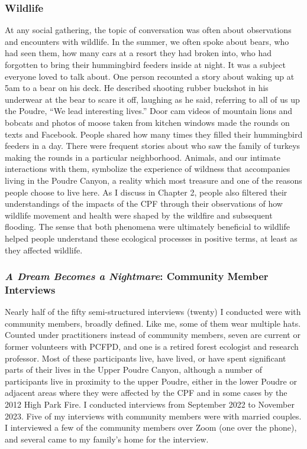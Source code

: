 \documentclass[
]{article}
\begin{document}
\subsubsection{Wildlife}\label{wildlife}

At any social gathering, the topic of conversation was often about observations and encounters with wildlife. In the summer, we often spoke about bears, who had seen them, how many cars at a resort they had broken into, who had forgotten to bring their hummingbird feeders inside at night. It was a subject everyone loved to talk about. One person recounted a story about waking up at 5am to a bear on his deck. He described shooting rubber buckshot in his underwear at the bear to scare it off, laughing as he said, referring to all of us up the Poudre, ``We lead interesting lives.'' Door cam videos of mountain lions and bobcats and photos of moose taken from kitchen windows made the rounds on texts and Facebook. People shared how many times they filled their hummingbird feeders in a day. There were frequent stories about who saw the family of turkeys making the rounds in a particular neighborhood. Animals, and our intimate interactions with them, symbolize the experience of wildness that accompanies living in the Poudre Canyon, a reality which most treasure and one of the reasons people choose to live here. As I discuss in Chapter 2, people also filtered their understandings of the impacts of the CPF through their observations of how wildlife movement and health were shaped by the wildfire and subsequent flooding. The sense that both phenomena were ultimately beneficial to wildlife helped people understand these ecological processes in positive terms, at least as they affected wildlife.

\subsubsection{\texorpdfstring{\emph{A Dream Becomes a Nightmare}: Community Member Interviews}{A Dream Becomes a Nightmare: Community Member Interviews}}\label{a-dream-becomes-a-nightmare-community-member-interviews}

Nearly half of the fifty semi-structured interviews (twenty) I conducted were with community members, broadly defined. Like me, some of them wear multiple hats. Counted under practitioners instead of community members, seven are current or former volunteers with PCFPD, and one is a retired forest ecologist and research professor. Most of these participants live, have lived, or have spent significant parts of their lives in the Upper Poudre Canyon, although a number of participants live in proximity to the upper Poudre, either in the lower Poudre or adjacent areas where they were affected by the CPF and in some cases by the 2012 High Park Fire. I conducted interviews from September 2022 to November 2023. Five of my interviews with community members were with married couples. I interviewed a few of the community members over Zoom (one over the phone), and several came to my family's home for the interview.
\end{document}
